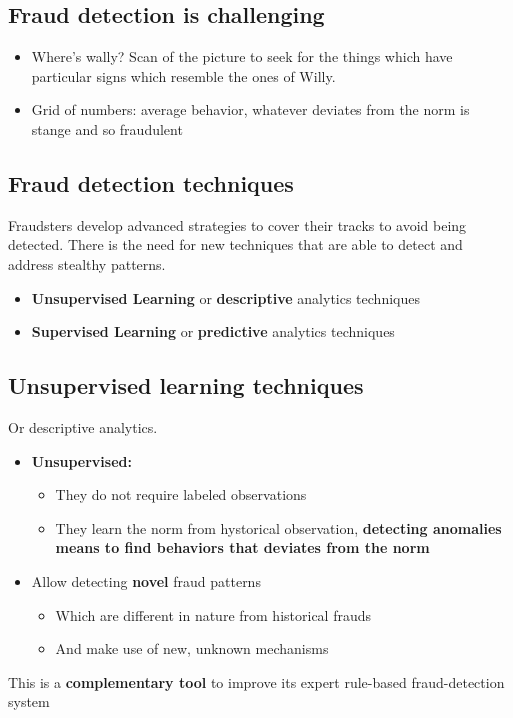     \subsection{Fraud detection is challenging}
        \begin{itemize}
            \item Where's wally? Scan of the picture to seek for the things which have particular signs which resemble the ones of Willy.
            \item Grid of numbers: average behavior, whatever deviates from the norm is stange and so fraudulent 
        \end{itemize}
    \subsection{Fraud detection techniques}
        Fraudsters develop advanced strategies to cover their tracks to avoid being detected. There is the need for new techniques that are able to detect and address stealthy patterns.
        \begin{itemize}
            \item \textbf{Unsupervised Learning} or \textbf{descriptive} analytics techniques
            \item \textbf{Supervised Learning} or \textbf{predictive} analytics techniques
        \end{itemize}
    \subsection{Unsupervised learning techniques}
        Or descriptive analytics.\\
        \begin{itemize}
            \item \textbf{Unsupervised:}
            \begin{itemize}
                \item They do not require labeled observations
                \item They learn the norm from hystorical observation, \textbf{detecting anomalies means to find behaviors that deviates from the norm}
            \end{itemize}
            \item Allow detecting \textbf{novel} fraud patterns
            \begin{itemize}
                \item Which are different in nature from historical frauds 
                \item And make use of new, unknown mechanisms 
            \end{itemize}
        \end{itemize}
        This is a \textbf{complementary tool} to improve its expert rule-based fraud-detection system
